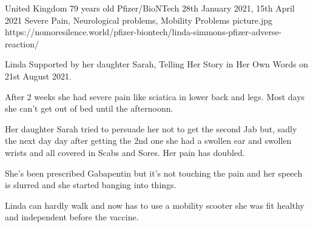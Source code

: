 {United Kingdom}
{79 years old}
{Pfizer/BioNTech}
{28th January 2021, 15th April 2021}
{Severe Pain, Neurological problems, Mobility Problems}
{picture.jpg}
{https://nomoresilence.world/pfizer-biontech/linda-simmons-pfizer-adverse-reaction/}
{

Linda Supported by her daughter Sarah, Telling Her Story in Her Own Words on
21st August 2021.

After 2 weeks she had severe pain like sciatica in lower back and legs. Most
days she can’t get out of bed until the afternoonn.

Her daughter Sarah tried to persuade her not to get the second Jab but, sadly
the next day day after getting the 2nd one she had a swollen ear and swollen
wrists and all covered in Scabs and Sores. Her pain has doubled.

She’s been prescribed Gabapentin but it’s not touching the pain and her speech
is slurred and she started banging into things.

Linda can hardly walk and now has to use a mobility scooter she was fit healthy
and independent before the vaccine.

}
